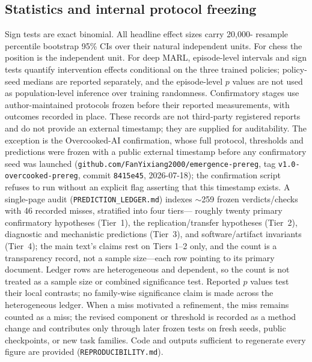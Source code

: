 \documentclass[11pt]{article}
\theoremstyle{definition}
\begin{document}
\subsection*{Statistics and internal protocol freezing}
Sign tests are exact binomial. All headline effect sizes carry 20,000-
resample percentile bootstrap 95\% CIs over their natural independent
units. For chess the position is the independent unit. For deep MARL,
episode-level intervals and sign tests quantify intervention effects
conditional on the three trained policies; policy-seed medians are
reported separately, and the episode-level $p$ values are not used as
population-level inference over training randomness. Confirmatory
stages use author-maintained protocols frozen before their reported
measurements, with outcomes recorded in place. These records are not
third-party registered reports and do not provide an external
timestamp; they are supplied for auditability. The exception is the
Overcooked-AI confirmation, whose full protocol, thresholds and
predictions were frozen with a public external timestamp before any
confirmatory seed was launched
(\texttt{github.com/FanYixiang2000/emergence-prereg}, tag
\texttt{v1.0-overcooked-prereg}, commit \texttt{8415e45},
2026-07-18); the confirmation script refuses to run without an
explicit flag asserting that this timestamp exists. A single-page audit
(\texttt{PREDICTION\_LEDGER.md}) indexes $\sim$259 frozen
verdicts/checks with 46 recorded misses, stratified into four tiers---
roughly twenty primary confirmatory hypotheses (Tier~1), the
replication/transfer hypotheses (Tier~2), diagnostic and mechanistic
predictions (Tier~3), and software/artifact invariants (Tier~4); the
main text's claims rest on Tiers 1--2 only, and the count is a
transparency record, not a sample size---each row pointing to its
primary document. Ledger rows are heterogeneous and dependent, so the
count is not treated as a sample size or combined significance test.
Reported $p$ values test their local contrasts; no family-wise
significance claim is made across the heterogeneous ledger.
When a miss motivated a refinement, the miss remains
counted as a miss; the revised component or threshold is recorded as a
method change and contributes only through later frozen tests on fresh
seeds, public checkpoints, or new task families. Code and outputs
sufficient to regenerate every figure are provided
(\texttt{REPRODUCIBILITY.md}).
\end{document}
